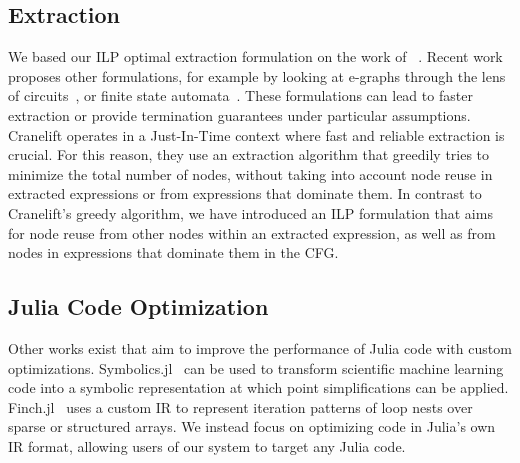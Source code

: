 \subsection{Extraction}
We based our ILP optimal extraction formulation on the work of \citeauthor{heImprovingTermExtraction2017}~\cite{heImprovingTermExtraction2017}.
Recent work proposes other formulations, for example by looking at e-graphs through the lens of circuits~\cite{sunEgraphsCircuitsOptimal2024}, or finite state automata~\cite{y.wangEGraphsVSAsTree2022}.
These formulations can lead to faster extraction or provide termination guarantees under particular assumptions.
Cranelift operates in a Just-In-Time context where fast and reliable extraction is crucial.
For this reason, they use an extraction algorithm that greedily tries to minimize the total number of nodes, without taking into account node reuse in extracted expressions or from expressions that dominate them.
In contrast to Cranelift's greedy algorithm, we have introduced an ILP formulation that aims for node reuse from other nodes within an extracted expression, as well as from nodes in expressions that dominate them in the CFG. 

\subsection{Julia Code Optimization}
Other works exist that aim to improve the performance of Julia code with custom optimizations.
Symbolics.jl~\cite{gowdaHighperformanceSymbolicnumericsMultiple2022} can be used to transform scientific machine learning code into a symbolic representation at which point simplifications can be applied.
Finch.jl~\cite{ahrensFinchSparseStructured2024,ahrensLoopletsLanguageStructured2023} uses a custom IR to represent iteration patterns of loop nests over sparse or structured arrays.
We instead focus on optimizing code in Julia's own IR format, allowing users of our system to target any Julia code.

